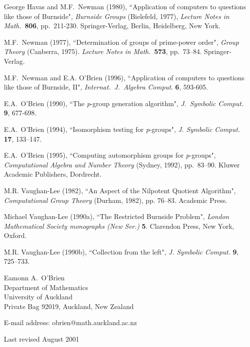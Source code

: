 \documentclass[12pt]{article}
\begin{document}
\begin{description}
\item George Havas and M.F.\ Newman (1980), ``Application of computers to
questions like those of Burnside", {\it Burnside Groups} (Bielefeld, 1977),
{\it Lecture Notes in Math.\ }{\bf 806}, pp.\ 211-230.
Springer-Verlag, Berlin, Heidelberg, New York.

\item M.F.\ Newman (1977), ``Determination of groups of prime-power order", 
{\it Group Theory} (Canberra, 1975). {\it Lecture Notes in Math.\ }{\bf 573},
pp.\ 73--84. 
Springer-Verlag.

\item M.F.\ Newman and E.A. O'Brien (1996),
``Application of computers to questions like those of Burnside, {II}",
{\it Internat.\ J.\ Algebra Comput}. {\bf 6}, 593-605.
 
\item E.A.\ O'Brien (1990), ``The {\it p}-group generation
algorithm", {\it J.\ Symbolic Comput.} {\bf 9}, 677-698.

\item E.A.\ O'Brien (1994), ``Isomorphism testing
for \mbox{{\it p}-groups}", {\it J. Symbolic Comput.} {\bf 17},
133--147.

\item E.A.\ O'Brien (1995), ``Computing automorphism groups for
{\it p}-groups",  {\it Computational Algebra and Number Theory}
(Sydney, 1992), pp.\ 83--90. Kluwer Academic Publishers, Dordrecht.

\item M.R. Vaughan-Lee (1982), ``An Aspect of the Nilpotent 
Quotient Algorithm", {\it Computational Group Theory}
(Durham, 1982), pp. 76--83. Academic Press.

\item Michael Vaughan-Lee (1990a), ``The Restricted Burnside Problem",
{\it London Mathematical Society monographs (New Ser.)} {\bf 5}.
Clarendon Press, New York, Oxford.

\item M.R. Vaughan-Lee (1990b), ``Collection from the left", 
{\it J. Symbolic Comput.} {\bf 9}, 725--733.

\end{description}

\noindent 
Eamonn A.\ O'Brien \\
Department of Mathematics \\
University of Auckland  \\
Private Bag 92019, Auckland, New Zealand

\vspace*{0.25cm}
\noindent 
E-mail address: obrien@math.auckland.ac.nz

\vspace*{0.35cm}
\noindent 
Last revised August 2001
\end{document}
